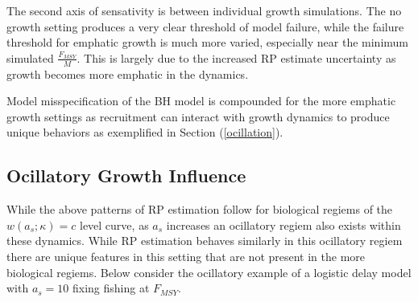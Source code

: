 %
The second axis of sensativity is between individual growth simulations.
The no growth setting produces a very clear threshold of model failure, while
the failure threshold for emphatic growth is much more varied, especially near
the minimum simulated $\frac{F_{MSY}}{M}$. %
This is largely due to the increased RP estimate uncertainty as growth becomes
more emphatic in the dynamics.

%
Model misspecification of the BH model is compounded for the more emphatic growth settings
as recruitment can interact with growth dynamics to produce unique behaviors as exemplified
in Section (\ref{ocillation}).



%
\clearpage
\subsection{Ocillatory Growth Influence\label{ocillation}}

%
While the above patterns of RP estimation follow for biological regiems
of the $w(a_s; \kappa)=c$ level curve, as $a_s$ increases an ocillatory
regiem also exists within these dynamics. While RP estimation behaves
similarly in this ocillatory regiem there are unique features in this
setting that are not present in the more biological regiems. Below
consider the ocillatory example of a logistic delay model with $a_s=10$ fixing
fishing at $F_{MSY}$.

